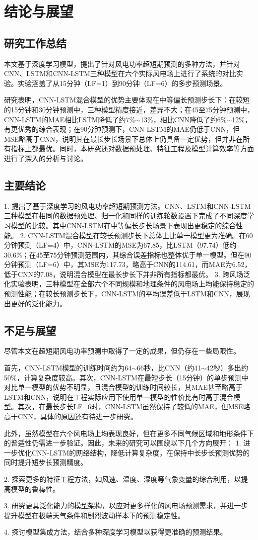 \section{结论与展望}

\subsection{研究工作总结}
本文基于深度学习模型，提出了针对风电功率超短期预测的多种方法，并针对CNN、LSTM和CNN-LSTM三种模型在六个实际风电场上进行了系统的对比实验。实验涵盖了从15分钟（LF=1）到90分钟（LF=6）的多步预测场景。

研究表明，CNN-LSTM混合模型的优势主要体现在中等偏长预测步长下：在较短的15分钟和30分钟预测中，三种模型精度接近，差异不大；在45至75分钟预测中，CNN-LSTM的MAE相比LSTM降低了约7\%$\sim$13\%，相比CNN降低了约6\%$\sim$12\%，有更优秀的综合表现；在90分钟预测下，CNN-LSTM的MAE仍低于CNN，但MSE略高于CNN，说明其在最长步长场景下总体上仍具备一定优势，但并非在所有指标上都最优。同时，本研究还对数据预处理、特征工程及模型计算效率等方面进行了深入的分析与讨论。

\subsection{主要结论}
1. 提出了基于深度学习的风电功率超短期预测方法。CNN、LSTM和CNN-LSTM三种模型在相同的数据预处理、归一化和同样的训练轮数设置下完成了不同深度学习模型的比较。其中CNN-LSTM在中等偏长步长场景下表现出更稳定的综合性能。
2. CNN-LSTM混合模型在较长预测步长下总体上比单一模型更为准确。在60分钟预测（LF=4）中，CNN-LSTM的MSE为67.85，比LSTM（97.74）低约30.6\%；在45至75分钟预测范围内，其综合误差指标也整体优于单一模型。但在90分钟预测（LF=6）中，其MSE为117.73，略高于CNN的114.61，而MAE为6.52，低于CNN的7.08，说明混合模型在最长步长下并非所有指标都最优。
3. 跨风场泛化实验表明，三种模型在全部六个不同规模和地理条件的风电场上均能保持稳定的预测性能；在较长预测步长下，CNN-LSTM的平均误差低于LSTM和CNN，展现出更好的泛化能力。


\subsection{不足与展望}
尽管本文在超短期风电功率预测中取得了一定的成果，但仍存在一些局限性。

首先，CNN-LSTM模型的训练时间约为64$\sim$66秒，比CNN（约41$\sim$42秒）多出约50\%，计算复杂度较高。其次，CNN-LSTM在最短步长（15分钟）的单步预测中对比单一模型的优势不明显，且混合模型的训练时间较长，其MAE甚至略高于LSTM和CNN，说明在工程实际应用下使用单一模型的性价比有时高于混合模型。其次，在最长步长LF=6时，CNN-LSTM虽然保持了较低的MAE，但MSE略高于CNN，具体的原因还有待进一步研究。

此外，虽然模型在六个风电场上均表现良好，但在更多不同气候区域和地形条件下的普适性仍需进一步验证。因此，未来的研究可以围绕以下几个方向展开：
1. 进一步优化CNN-LSTM的网络结构，降低计算复杂度，在保持中长步长预测优势的同时提升短步长预测精度。

2. 探索更多的特征工程方法，如风速、温度、湿度等气象变量的综合利用，以提高模型的鲁棒性。

3. 研究更具泛化能力的模型架构，以应对更多样化的风电场预测需求，并进一步提升模型在极端天气条件和剧烈波动样本下的预测稳定性。

4. 探讨模型集成方法，结合多种深度学习模型以获得更准确的预测结果。
